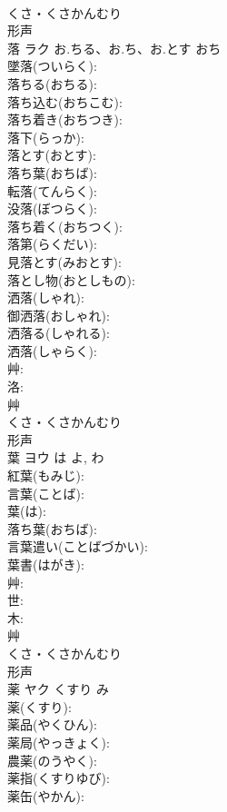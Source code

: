 \documentclass[8pt]{extreport}
\begin{document}
\begin{CJK}{UTF8}{min}
\\	くさ・くさかんむり	
\\	形声 
\\	落	ラク	お.ちる、お.ち、お.とす	おち	
\\	墜落(ついらく): 
\\	落ちる(おちる): 
\\	落ち込む(おちこむ): 
\\	落ち着き(おちつき): 
\\	落下(らっか): 
\\	落とす(おとす): 
\\	落ち葉(おちば): 
\\	転落(てんらく): 
\\	没落(ぼつらく): 
\\	落ち着く(おちつく): 
\\	落第(らくだい): 
\\	見落とす(みおとす): 
\\	落とし物(おとしもの): 
\\	洒落(しゃれ): 
\\	御洒落(おしゃれ): 
\\	洒落る(しゃれる): 
\\	洒落(しゃらく): 
\\	艸: 
\\	洛: 
\\	艸	
\\	くさ・くさかんむり	
\\	形声 
\\	葉	ヨウ	は	よ, わ	
\\	紅葉(もみじ): 
\\	言葉(ことば): 
\\	葉(は): 
\\	落ち葉(おちば): 
\\	言葉遣い(ことばづかい): 
\\	葉書(はがき): 
\\	艸: 
\\	世: 
\\	木: 
\\	艸	
\\	くさ・くさかんむり	
\\	形声 
\\	薬	ヤク	くすり	み	
\\	薬(くすり): 
\\	薬品(やくひん): 
\\	薬局(やっきょく): 
\\	農薬(のうやく): 
\\	薬指(くすりゆび): 
\\	薬缶(やかん): 

\end{CJK}
\end{document}
